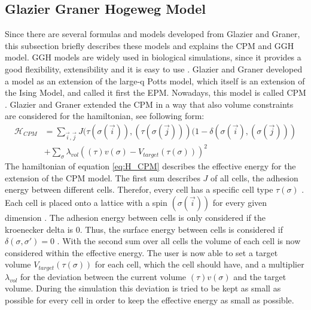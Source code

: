 \subsection{Glazier Graner Hogeweg Model} \label{subsec:Intro_GGH}
Since there are several formulas and models developed from Glazier and Graner, this subsection briefly describes these models and explains the \ac{CPM} and \ac{GGH} model.\newline
\ac{GGH} models are widely used in biological simulations, since it provides a good flexibility, extensibility and it is easy to use \cite{Glazier2007}. 
Glazier and Graner developed a model as an extension of the large-q Potts model, which itself is an extension of the Ising Model, and called it first the \ac{EPM}. Nowadays, this model is called \ac{CPM} \cite{Glazier2007, Graner1992, Glazier1993}.
Glazier and Graner extended the \ac{CPM} in a way that also volume constraints are considered for the hamiltonian, see following form:
\begin{equation}\label{eq:H_CPM}
\begin{split}
\mathcal{H}_{CPM} & = \sum_{\vec{i},\vec{j}}^{ }J(\tau(\sigma(\vec{i})),(\tau(\sigma(\vec{j})))(1-\delta(\sigma(\vec{i}),(\sigma(\vec{j}))) \\
		 & + \sum_{\sigma}^{}{\lambda_{vol}((\tau)v(\sigma)-V_{target}(\tau(\sigma)))^2}
\end{split}
\end{equation}
The hamiltonian of equation \ref{eq:H_CPM} describes the effective energy for the extension of the \ac{CPM} model. The first sum describes $J$ of all cells, the adhesion energy between different cells. Therefor, every cell has a specific cell type $\tau(\sigma)$ \cite{Glazier1993, Graner1992}. Each cell is placed onto a lattice with a spin $(\sigma(\vec{i}))$ for every given dimension \cite{Graner1992, Glazier2007}. The adhesion energy between cells is only considered if the kroenecker delta is 0. Thus, the surface energy between cells is considered if $\delta(\sigma, \sigma') = 0$ \cite{Glazier1993, Graner1992, Stott1999, Glazier2007, Chen2007, Cickovski2005}. \newline
With the second sum over all cells the volume of each cell is now considered within the effective energy. The user is now able to set a target volume $V_{target}(\tau(\sigma))$ for each cell, which the cell should have, and a multiplier $\lambda_{vol}$ for the deviation between the current volume $(\tau)v(\sigma)$ and the target volume. During the simulation this deviation is tried to be kept as small as possible for every cell in order to keep the effective energy as small as possible.

